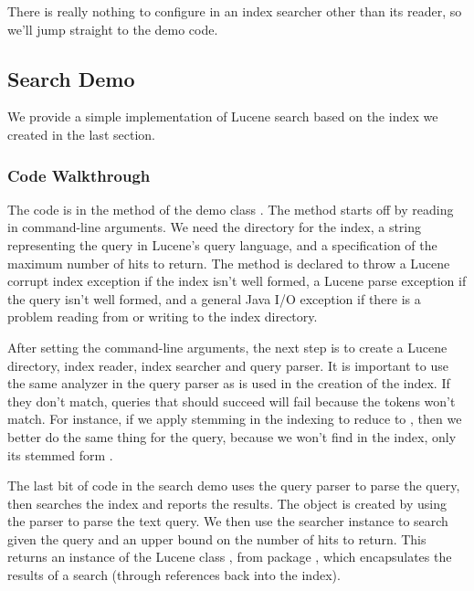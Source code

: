 There is really nothing to configure in an index searcher other
than its reader, so we'll jump straight to the demo code.

\subsection{Search Demo}\label{section:lucene-search}

We provide a simple implementation of Lucene search based on the index
we created in the last section.  

\subsubsection{Code Walkthrough}

The code is in the  method of the demo class
.  The method starts off by reading in command-line
arguments.
%
%
We need the directory for the index, a string representing the query
in Lucene's query language, and a specification of the maximum number
of hits to return.  The method is declared to throw a Lucene corrupt
index exception if the index isn't well formed, a Lucene parse
exception if the query isn't well formed, and a general Java I/O
exception if there is a problem reading from or writing to the index
directory.

After setting the command-line arguments, the next step is to
create a Lucene directory, index reader, index searcher and
query parser.
%
%
It is important to use the same analyzer in the query parser as is
used in the creation of the index.  If they don't match, queries that
should succeed will fail because the tokens won't match.  For
instance, if we apply stemming in the indexing to reduce
 to , then we better do the
same thing for the query, because we won't find 
in the index, only its stemmed form .

The last bit of code in the search demo uses the query parser to parse
the query, then searches the index and reports the results.
%
%
The  object is created by using the parser to parse the
text query.  We then use the searcher instance to search given the
query and an upper bound on the number of hits to return.  This
returns an instance of the Lucene class , from package
, which encapsulates the results of a search (through
references back into the index).

